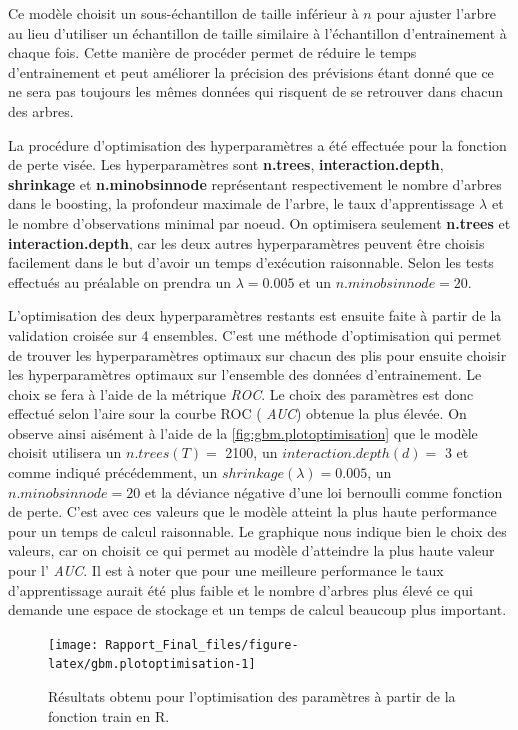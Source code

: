 \documentclass[]{article}
\begin{document}
Ce modèle choisit un sous-échantillon de taille inférieur à \(n\) pour
ajuster l'arbre au lieu d'utiliser un échantillon de taille similaire à
l'échantillon d'entrainement à chaque fois. Cette manière de procéder
permet de réduire le temps d'entrainement et peut améliorer la précision
des prévisions étant donné que ce ne sera pas toujours les mêmes données
qui risquent de se retrouver dans chacun des arbres.

La procédure d'optimisation des hyperparamètres a été effectuée pour la
fonction de perte visée. Les hyperparamètres sont \textbf{n.trees},
\textbf{interaction.depth}, \textbf{shrinkage} et
\textbf{n.minobsinnode} représentant respectivement le nombre d'arbres
dans le boosting, la profondeur maximale de l'arbre, le taux
d'apprentissage \(\lambda\) et le nombre d'observations minimal par
noeud. On optimisera seulement \textbf{n.trees} et
\textbf{interaction.depth}, car les deux autres hyperparamètres peuvent
être choisis facilement dans le but d'avoir un temps d'exécution
raisonnable. Selon les tests effectués au préalable on prendra un
\(\lambda = 0.005\) et un \(n.minobsinnode = 20\).

L'optimisation des deux hyperparamètres restants est ensuite faite à
partir de la validation croisée sur 4 ensembles. C'est une méthode
d'optimisation qui permet de trouver les hyperparamètres optimaux sur
chacun des plis pour ensuite choisir les hyperparamètres optimaux sur
l'ensemble des données d'entrainement. Le choix se fera à l'aide de la
métrique \emph{ROC}. Le choix des paramètres est donc effectué selon
l'aire sour la courbe ROC ( \emph{AUC}) obtenue la plus élevée. On
observe ainsi aisément à l'aide de la \autoref{fig:gbm.plotoptimisation}
que le modèle choisit utilisera un \(n.trees(T) =\) 2100, un
\(interaction.depth(d) =\) 3 et comme indiqué précédemment, un
\(shrinkage(\lambda) = 0.005\), un \(n.minobsinnode = 20\) et la
déviance négative d'une loi bernoulli comme fonction de perte. C'est
avec ces valeurs que le modèle atteint la plus haute performance pour un
temps de calcul raisonnable. Le graphique nous indique bien le choix des
valeurs, car on choisit ce qui permet au modèle d'atteindre la plus
haute valeur pour l' \emph{AUC}. Il est à noter que pour une meilleure
performance le taux d'apprentissage aurait été plus faible et le nombre
d'arbres plus élevé ce qui demande une espace de stockage et un temps de
calcul beaucoup plus important.

\newpage

\begin{figure}

{\centering \texttt{[image: Rapport\_Final\_files/figure-latex/gbm.plotoptimisation-1]} 

}

\caption{Résultats obtenu pour l'optimisation des paramètres à partir de la fonction train en R.}\label{fig:gbm.plotoptimisation}
\end{figure}
\end{document}
